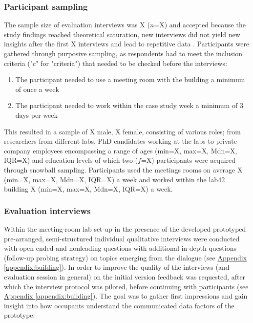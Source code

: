 \subsubsection{Participant sampling}

The sample size of evaluation interviews was X ($n$=X) and accepted because the study findings reached theoretical saturation, new interviews did not yield new insights after the first X interviews and lead to repetitive data \cite{steph_menken_introduction_2016}. Participants were gathered through purposive sampling, as respondents had to meet the inclusion criteria ("c" for "criteria") that needed to be checked before the interviews: 

\begin{enumerate}
    \renewcommand{\labelenumi}{C\arabic{enumi}:}
    \item The participant needed to use a meeting room with the building a minimum of once a week
    \item The participant needed to work within the case study week a minimum of 3 days per week
\end{enumerate}

This resulted in a sample of X male, X female, consisting of various roles; from researchers from different labs, PhD candidates working at the labs to private company employees encompassing a range of ages (min=X, max=X, Mdn=X, IQR=X) and education levels of which two ($f$=X) participants were acquired through snowball sampling. Participants used the meetings rooms on average X (min=X, max=X, Mdn=X, IQR=X) a week and worked within the lab42 building X (min=X, max=X, Mdn=X, IQR=X) a week.

\subsubsection{Evaluation interviews}

Within the meeting-room lab set-up in the presence of the developed prototyped pre-arranged, semi-structured individual qualitative interviews were conducted with open-ended and nonleading questions with additional in-depth questions (follow-up probing strategy) on topics emerging from the dialogue (see \hyperref[appendix:building]{Appendix \ref*{appendix:building}}). In order to improve the quality of the interviews (and evaluation session in general) on the initial version feedback was requested, after which the interview protocol was piloted, before continuing with participants (see \hyperref[appendix:building]{Appendix \ref*{appendix:building}}). The goal was to gather first impressions and gain insight into how occupants understand the communicated data factors of the prototype.

